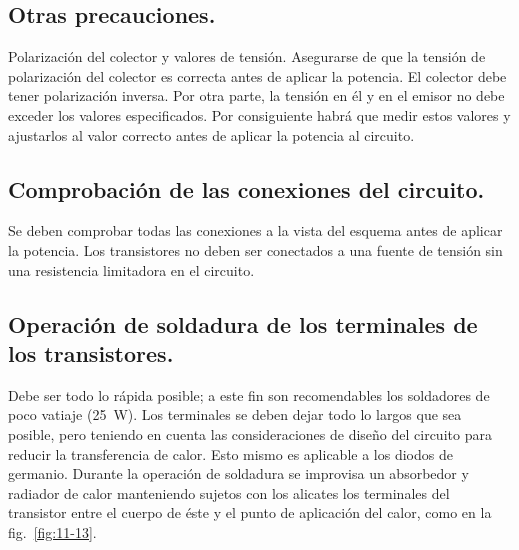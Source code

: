 \documentclass[a4paper,12pt]{article}
\begin{document}
\subsection{Otras precauciones.}
Polarización del colector y valores de tensión. Asegurarse de que la tensión
de polarización del colector es correcta antes de aplicar la potencia. El
colector debe tener polarización inversa. Por otra parte, la tensión en
él y en el emisor no debe exceder los valores especificados.
Por consiguiente habrá que medir estos valores y ajustarlos al valor correcto antes de
aplicar la potencia al circuito.

\subsection{Comprobación de las conexiones del circuito.}
Se deben comprobar todas las conexiones a la vista del esquema antes de aplicar la potencia.
Los transistores no deben ser conectados a una fuente de tensión sin una resistencia limitadora
en el circuito.

\subsection{Operación de soldadura de los terminales de los transistores.}
Debe ser todo lo rápida posible; a este fin son recomendables los
soldadores de poco vatiaje (\SI{25}{\watt}). Los terminales se deben dejar todo lo
largos que sea posible, pero teniendo en cuenta las consideraciones de
diseño del circuito para reducir la transferencia de calor. Esto mismo
es aplicable a los diodos de germanio. Durante la operación de soldadura
se improvisa un absorbedor y radiador de calor manteniendo sujetos con
los alicates los terminales del transistor entre el cuerpo de éste y el
punto de aplicación del calor, como en la fig.~\ref{fig:11-13}.
\end{document}

